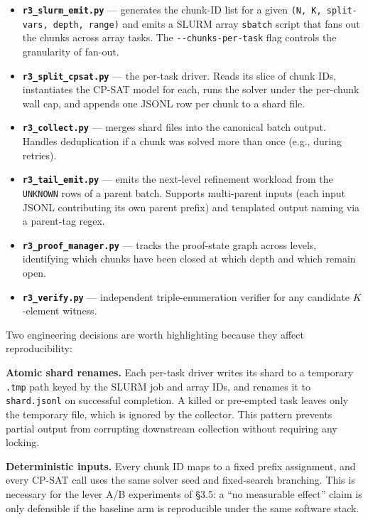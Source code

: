 \begin{itemize}
\tightlist
\item
  \textbf{\texttt{r3\_slurm\_emit.py}} --- generates the chunk-ID list for a given
  \texttt{(N,\ K,\ split-vars,\ depth,\ range)} and emits a SLURM array
  \texttt{sbatch} script that fans out the chunks across array tasks. The
  \texttt{-\/-chunks-per-task} flag controls the granularity of fan-out.
\item
  \textbf{\texttt{r3\_split\_cpsat.py}} --- the per-task driver. Reads its slice of
  chunk IDs, instantiates the CP-SAT model for each, runs the solver
  under the per-chunk wall cap, and appends one JSONL row per chunk
  to a shard file.
\item
  \textbf{\texttt{r3\_collect.py}} --- merges shard files into the canonical batch
  output. Handles deduplication if a chunk was solved more than
  once (e.g., during retries).
\item
  \textbf{\texttt{r3\_tail\_emit.py}} --- emits the next-level refinement workload
  from the \texttt{UNKNOWN} rows of a parent batch. Supports multi-parent
  inputs (each input JSONL contributing its own parent prefix) and
  templated output naming via a parent-tag regex.
\item
  \textbf{\texttt{r3\_proof\_manager.py}} --- tracks the proof-state graph across
  levels, identifying which chunks have been closed at which depth
  and which remain open.
\item
  \textbf{\texttt{r3\_verify.py}} --- independent triple-enumeration verifier for
  any candidate $K$-element witness.
\end{itemize}

Two engineering decisions are worth highlighting because they affect
reproducibility:

\textbf{Atomic shard renames.} Each per-task driver writes its shard to
a temporary \texttt{.tmp} path keyed by the SLURM job and array IDs, and renames it
to \texttt{shard.jsonl} on successful completion. A killed or pre-empted
task leaves only the temporary file, which is ignored by the
collector. This pattern prevents partial output from corrupting
downstream collection without requiring any locking.

\textbf{Deterministic inputs.} Every chunk ID maps to a fixed prefix assignment,
and every CP-SAT call uses the same solver seed and fixed-search branching.
This is necessary for the lever A/B experiments of §3.5: a ``no measurable
effect'' claim is only defensible if the baseline arm is reproducible under
the same software stack.

